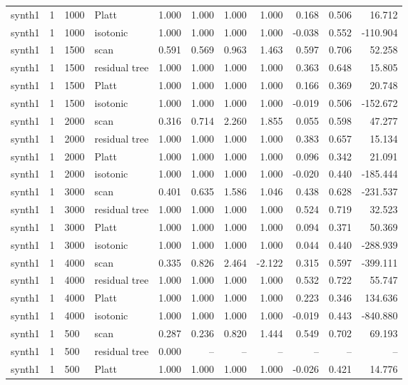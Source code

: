 \begin{tabular}{lrllrrrrrrr}
synth1 & 1 & 1000 & Platt & 1.000 & 1.000 & 1.000 & 1.000 & 0.168 & 0.506 & 16.712 \\
synth1 & 1 & 1000 & isotonic & 1.000 & 1.000 & 1.000 & 1.000 & -0.038 & 0.552 & -110.904 \\
synth1 & 1 & 1500 & scan & 0.591 & 0.569 & 0.963 & 1.463 & 0.597 & 0.706 & 52.258 \\
synth1 & 1 & 1500 & residual tree & 1.000 & 1.000 & 1.000 & 1.000 & 0.363 & 0.648 & 15.805 \\
synth1 & 1 & 1500 & Platt & 1.000 & 1.000 & 1.000 & 1.000 & 0.166 & 0.369 & 20.748 \\
synth1 & 1 & 1500 & isotonic & 1.000 & 1.000 & 1.000 & 1.000 & -0.019 & 0.506 & -152.672 \\
synth1 & 1 & 2000 & scan & 0.316 & 0.714 & 2.260 & 1.855 & 0.055 & 0.598 & 47.277 \\
synth1 & 1 & 2000 & residual tree & 1.000 & 1.000 & 1.000 & 1.000 & 0.383 & 0.657 & 15.134 \\
synth1 & 1 & 2000 & Platt & 1.000 & 1.000 & 1.000 & 1.000 & 0.096 & 0.342 & 21.091 \\
synth1 & 1 & 2000 & isotonic & 1.000 & 1.000 & 1.000 & 1.000 & -0.020 & 0.440 & -185.444 \\
synth1 & 1 & 3000 & scan & 0.401 & 0.635 & 1.586 & 1.046 & 0.438 & 0.628 & -231.537 \\
synth1 & 1 & 3000 & residual tree & 1.000 & 1.000 & 1.000 & 1.000 & 0.524 & 0.719 & 32.523 \\
synth1 & 1 & 3000 & Platt & 1.000 & 1.000 & 1.000 & 1.000 & 0.094 & 0.371 & 50.369 \\
synth1 & 1 & 3000 & isotonic & 1.000 & 1.000 & 1.000 & 1.000 & 0.044 & 0.440 & -288.939 \\
synth1 & 1 & 4000 & scan & 0.335 & 0.826 & 2.464 & -2.122 & 0.315 & 0.597 & -399.111 \\
synth1 & 1 & 4000 & residual tree & 1.000 & 1.000 & 1.000 & 1.000 & 0.532 & 0.722 & 55.747 \\
synth1 & 1 & 4000 & Platt & 1.000 & 1.000 & 1.000 & 1.000 & 0.223 & 0.346 & 134.636 \\
synth1 & 1 & 4000 & isotonic & 1.000 & 1.000 & 1.000 & 1.000 & -0.019 & 0.443 & -840.880 \\
synth1 & 1 & 500 & scan & 0.287 & 0.236 & 0.820 & 1.444 & 0.549 & 0.702 & 69.193 \\
synth1 & 1 & 500 & residual tree & 0.000 & -- & -- & -- & -- & -- & -- \\
synth1 & 1 & 500 & Platt & 1.000 & 1.000 & 1.000 & 1.000 & -0.026 & 0.421 & 14.776 \\

\end{tabular}

